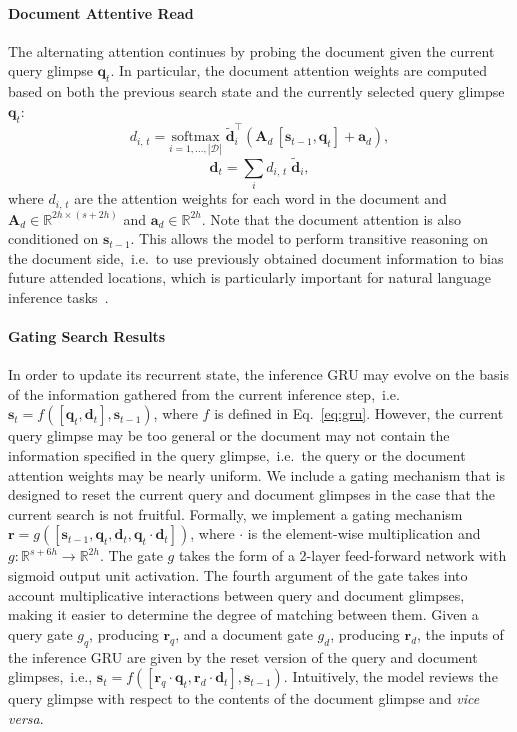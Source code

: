 \documentclass[11pt]{article}
\begin{document}
\paragraph{Document Attentive Read} The alternating attention continues by probing the document given the current query glimpse $\mathbf{q}_t$.
In particular, the document attention weights are computed based on both the previous search state and the currently selected query glimpse $\mathbf{q}_t$:
\[
d_{i,\, t} = \underset{i = 1, \ldots, \mathcal{|D|}}{\text{softmax}}\; \mathbf{\tilde{d}}_i^\top(\mathbf{A}_d \, [\mathbf{s}_{t-1}, \mathbf{q}_t] + \mathbf{a}_d),
\]
\[
\mathbf{d}_t = \sum_i d_{i,\, t}\; \mathbf{\tilde{d}}_i,
\]
where $d_{i,\, t}$ are the attention weights for each word in the document and $\mathbf{A}_d \in \mathbb{R}^{2h \times (s + 2h)}$ and $\mathbf{a}_d \in \mathbb{R}^{2h}$.
Note that the document attention is also conditioned on $\mathbf{s}_{t - 1}$. This allows the model to perform transitive reasoning on the document side,~i.e.~to use previously obtained document information to bias future attended locations, which is particularly important for natural language inference tasks~\cite{sukhbaatar2015end}.

\paragraph{Gating Search Results} In order to update its recurrent state, the inference GRU may evolve on the basis of the information gathered from the current inference step,~i.e. $\mathbf{s}_t = f([\mathbf{q}_t, \mathbf{d}_t], \mathbf{s}_{t-1})$, where $f$ is defined in Eq.~\ref{eq:gru}. However, the current query glimpse may be too general or the document may not contain the information specified in the query glimpse,~i.e.~the query or the document attention weights may be nearly uniform. We include a gating mechanism that is designed to reset the current query and document glimpses in the case that the current search is not fruitful. Formally, we implement a gating mechanism $\mathbf{r} = g([\mathbf{s}_{t-1}, \mathbf{q}_t, \mathbf{d}_t, \mathbf{q}_t \cdot \mathbf{d}_t])$, where $\cdot$ is the element-wise multiplication and $g : \mathbb{R}^{s + 6h} \rightarrow \mathbb{R}^{2h}$. The gate $g$ takes the form of a 2-layer feed-forward network with sigmoid output unit activation. The fourth argument of the gate takes into account multiplicative interactions between query and document glimpses, making it easier to determine the degree of matching between them. Given a query gate $g_q$, producing $\mathbf{r}_q$, and a document gate $g_d$, producing $\mathbf{r}_d$, the inputs of the inference GRU are given by the reset version of the query and document glimpses,~i.e., $\mathbf{s}_t = f([\mathbf{r}_q \cdot \mathbf{q}_t, \mathbf{r}_d \cdot \mathbf{d}_t], \mathbf{s}_{t-1})$. Intuitively, the model reviews the query glimpse with respect to the contents of the document glimpse and {\it vice versa}.
\end{document}
